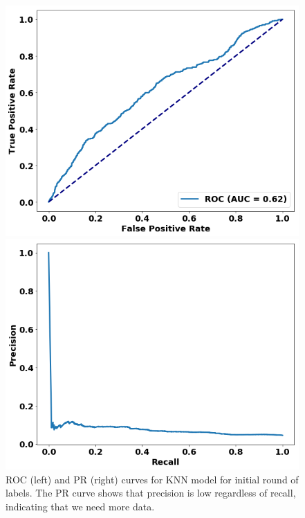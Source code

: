 \begin{figure}
\centering
\begin{minipage}[b]{.4\textwidth}
\includegraphics[trim=0in 0.1in 0.1in 0.in,clip,width=1.0\textwidth]{figures/roc_init.png}
\end{minipage}\qquad
\hspace{2ex}
\begin{minipage}[b]{.4\textwidth}
\includegraphics[trim=0in 0.1in 0.1in 0.in,clip,width=1.0\textwidth]{figures/prc_init.png}
\end{minipage}
\caption{ROC (left) and PR (right) curves for KNN model for initial round of labels. The PR curve shows that precision is low regardless of recall, indicating that we need more data.%
}
\end{figure}

